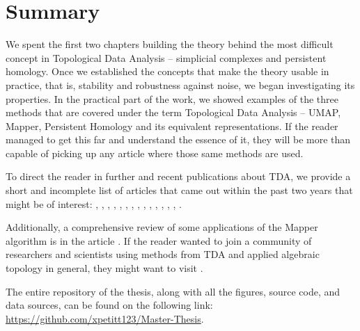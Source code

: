 \chapter*{Summary}

We spent the first two chapters building the theory behind the most difficult concept in Topological Data Analysis -- simplicial complexes and persistent homology. Once we established the concepts that make the theory usable in practice, that is, stability and robustness against noise, we began investigating its properties. In the practical part of the work, we showed examples of the three methods that are covered under the term Topological Data Analysis -- UMAP, Mapper, Persistent Homology and its equivalent representations. If the reader managed to get this far and understand the essence of it, they will be more than capable of picking up any article where those same methods are used.

To direct the reader in further and recent publications about TDA, we provide a short and incomplete list of articles that came out within the past two years that might be of interest: \cite{wei2025short}, \cite{ali2025leveraging}, \cite{jing2025topology}, \cite{jetomo2025filipino}, \cite{wiseman2025persistent}, \cite{arun2025topo}, \cite{mototaketopological}, \cite{pedersen2024active}, \cite{luchinsky2024tdavec}, \cite{hernandez2024topological}, \cite{cuerno2025topological}, \cite{arfi2024promises}, \cite{dos2025topological}, \cite{selicato2025topological}, \cite{boyd2024big}.

Additionally, a comprehensive review of some applications of the Mapper algorithm is in the article \cite{madukpe2025comprehensive}. If the reader wanted to join a community of researchers and scientists using methods from TDA and applied algebraic topology in general, they might want to visit \cite{AATRN}.

The entire repository of the thesis, along with all the figures, source code, and data sources, can be found on the following link: \url{https://github.com/xpetitt123/Master-Thesis}.
